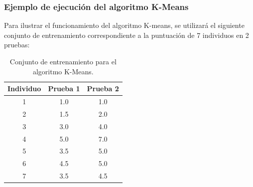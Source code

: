 \subsubsection{Ejemplo de ejecución del algoritmo K-Means}
Para ilustrar el funcionamiento del algoritmo K-means, se utilizará el siguiente conjunto de entrenamiento correspondiente a la puntuación de 7 individuos en 2 pruebas:

\begin{table}[H]
	\begin{center}
		\label{tab:conjuntoKMeans}
		\begin{tabular}{c|c|c}
			\textbf{Individuo} & \textbf{Prueba 1} & \textbf{Prueba 2}\\
			\hline
			1 & 1.0 & 1.0\\
			2 & 1.5 & 2.0\\
			3 & 3.0 & 4.0\\
			4 & 5.0 & 7.0\\
			5 & 3.5 & 5.0\\
			6 & 4.5 & 5.0\\
			7 & 3.5 & 4.5\\
		\end{tabular}
	\end{center}
	\caption{Conjunto de entrenamiento para el algoritmo K-Means.}
\end{table}

